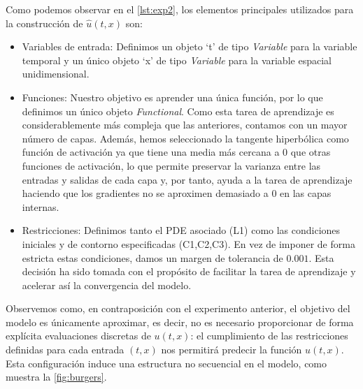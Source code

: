 Como podemos observar en el \autoref{lst:exp2}, los elementos principales utilizados para la construcción de $\hat{u}(t,x)$ son:

\begin{itemize}

    \item Variables de entrada: Definimos un objeto `t' de tipo \textit{Variable} para la variable temporal y un único objeto `x' de tipo \textit{Variable} para la variable espacial unidimensional.
    
    \item Funciones: Nuestro objetivo es aprender una única función, por lo que definimos un único objeto \textit{Functional}. Como esta tarea de aprendizaje es considerablemente más compleja que las anteriores, contamos con un mayor número de capas. Además, hemos seleccionado la tangente hiperbólica como función de activación ya que tiene una media más cercana a $0$ que otras funciones de activación, lo que permite preservar la varianza entre las entradas y salidas de cada capa y, por tanto, ayuda a la tarea de aprendizaje haciendo que los gradientes no se aproximen demasiado a $0$ en las capas internas. 
    
    \item Restricciones: Definimos tanto el PDE asociado (L1) como las condiciones iniciales y de contorno especificadas (C1,C2,C3). En vez de imponer de forma estricta estas condiciones, damos un margen de tolerancia de $0.001$. Esta decisión ha sido tomada con el propósito de facilitar la tarea de aprendizaje y acelerar así la convergencia del modelo. 
\end{itemize}

Observemos como, en contraposición con el experimento anterior, el objetivo del modelo es únicamente aproximar, es decir, no es necesario proporcionar de forma explícita evaluaciones discretas de $u(t,x)$: el cumplimiento de las restricciones definidas para cada entrada $(t,x)$ nos permitirá predecir la función $u(t,x)$. Esta configuración induce una estructura no secuencial en el modelo, como muestra la \autoref{fig:burgers}.

